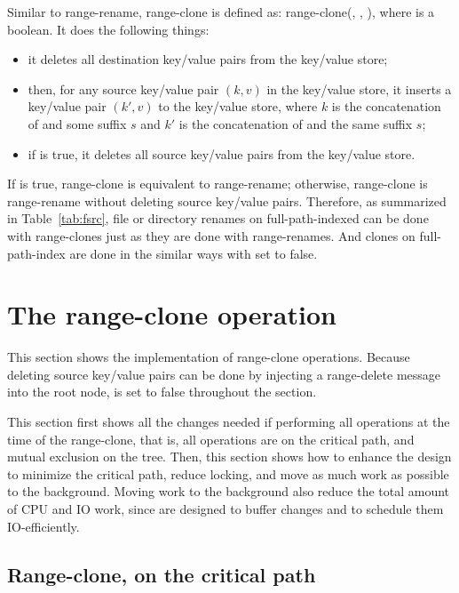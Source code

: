 Similar to range-rename, range-clone is defined as:
range-clone(\spre, \dpre, \delold), where \delold is a boolean.
It does the following things:
\begin{itemize}
\item it deletes all destination key/value pairs from the key/value store;
\item then, for any source key/value pair $(k,v)$ in the key/value store,
it inserts a key/value pair $(k',v)$ to the key/value store,
where $k$ is the concatenation of \spre and some suffix $s$ and $k'$ is the
concatenation of \dpre and the same suffix $s$;
\item if \delold is true, it deletes all source key/value pairs from the
key/value store.
\end{itemize}
If \delold is true, range-clone is equivalent to range-rename;
otherwise, range-clone is range-rename without deleting source key/value pairs.
Therefore, as summarized in Table~\ref{tab:fsrc},
file or directory renames on full-path-indexed \betrfs can be done
with range-clones just as they are done with range-renames.
And clones on full-path-index \betrfs are done in the similar ways with \delold
set to false.

\section{The range-clone operation}

This section shows the implementation of range-clone operations.
Because deleting source key/value pairs can be done by injecting a range-delete
message into the root node,
\delold is set to false throughout the section.

This section first shows all the changes needed if performing all operations
at the time of the range-clone, that is, all operations are on the critical
path, and mutual exclusion on the tree.
Then, this section shows how to enhance the design to minimize the critical
path, reduce locking, and move as much work as possible to the background.
Moving work to the background also reduce the total amount of CPU and IO work,
since \bets are designed to buffer changes and to schedule them IO-efficiently.

\subsection{Range-clone, on the critical path}

